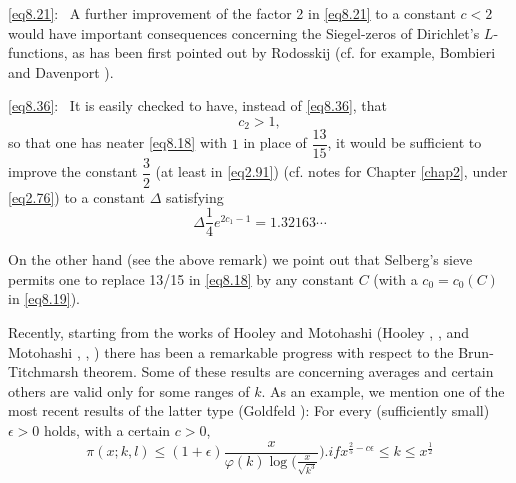 \eqref{eq8.21}:~ A further improvement of the factor 2 in
\eqref{eq8.21} to a constant $c<2$ would have important consequences
concerning the Siegel-zeros of Dirichlet's $L$-functions, as has been
first pointed out by Rodosskij (cf. for example, Bombieri and
Davenport \cite{key2}). 

\eqref{eq8.36}:~ It is easily checked to have, instead of \eqref{eq8.36}, that 
\begin{equation*}
c_2>1,\tag{8.40}\label{eq8.40} 
\end{equation*}
so that one has neater \eqref{eq8.18} with $1$ in place of $\dfrac{13}{15}$,
it would be sufficient to improve the constant $\dfrac{3}{2}$ (at least
in \eqref{eq2.91}) (cf. notes for Chapter \ref{chap2}, under
\eqref{eq2.76}) to a constant $\Delta$ satisfying 
\begin{equation*}
\Delta \frac{1}{4} e^{2c_1 -1}= 1.32163 \cdots
\tag{8.41}\label{eq8.41} 
\end{equation*}

On the other hand (see the above remark) we point out that Selberg's
sieve permits one to replace 13/15 in \eqref{eq8.18} by any constant
$C$ (with a $c_0 = c_0(C)$ in \eqref{eq8.19}). 

Recently, starting from the works of Hooley and Motohashi (Hooley
\cite{key2}, \cite{key6}, and Motohashi \cite{key8}, \cite{key9},
\cite{key11}) there has been a
remarkable progress with respect to the Brun-Titchmarsh theorem. Some
of these results are concerning averages and certain others are valid
only for some ranges of $k$. As an example, we mention one of the most
recent results of the latter type (Goldfeld \cite{key4}): For every
(sufficiently small) $\epsilon >0$ holds, with a certain $c>0$, 
\begin{equation*}
\pi(x;k,l) \leq (1 +\epsilon) \frac{x}{\varphi(k) \log
  (\frac{x}{\sqrt{k^3}}}). if x^{\frac{2}{5} -c \epsilon} \leq k \leq
x^{\frac{1}{2}}\tag{8.42}\label{eq8.42}  
\end{equation*}
